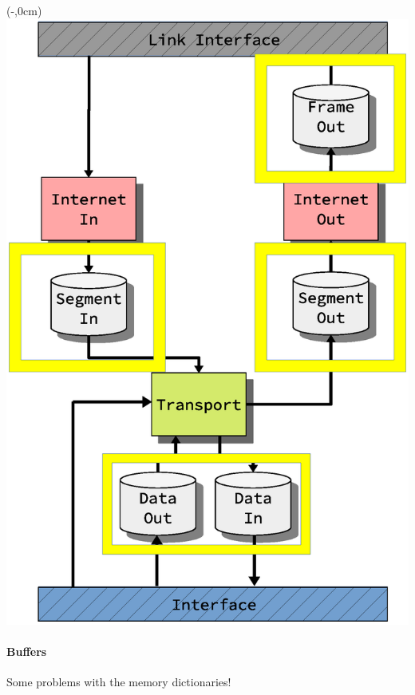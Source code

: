 \begin{frame}[fragile]
    \begin{textblock*}{\displayThumbnail}(\paperwidth-\displayThumbnail-0.2cm,0cm) %
        \colorbox{white}{\includegraphics[width=\textwidth]{implementation/design_2_memory.eps}}
    \end{textblock*}
    \frametitle{\ImplementationTitle}
    \framesubtitle{Buffers}
    Some problems with the memory dictionaries!
    \begin{figure}[ht]
        \centering
        \begin{overlayarea}{0.76\textwidth}{\textheight}

\end{overlayarea}
\end{figure}
\end{frame}
